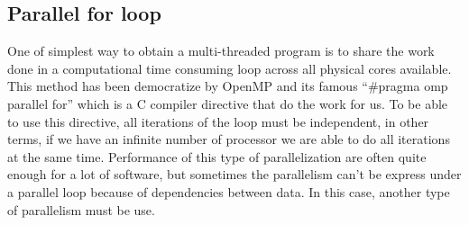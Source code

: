 \subsection{Parallel for loop}
One of simplest way to obtain a multi-threaded program is to share the work done in a computational time consuming loop across all physical cores available.
%
This method has been democratize by OpenMP and its famous ``\#pragma omp parallel for'' which is a C compiler directive that do the work for us.
%
To be able to use this directive, all iterations of the loop must be independent, in other terms, if we have an infinite number of processor we are able to do all iterations at the same time.
%
Performance of this type of parallelization are often quite enough for a lot of software, but sometimes the parallelism can't be express under a parallel loop because of dependencies between data.
%
In this case, another type of parallelism must be use.


